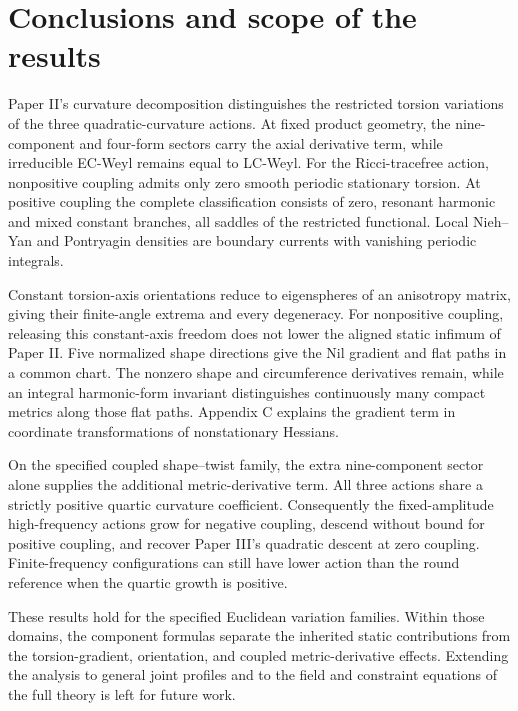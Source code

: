 \section{Conclusions and scope of the results}

Paper II's curvature decomposition distinguishes the restricted torsion
variations of the three quadratic-curvature actions. At fixed product geometry,
the nine-component and four-form sectors carry the axial derivative term,
while irreducible EC-Weyl remains equal to LC-Weyl. For the Ricci-tracefree action, nonpositive coupling admits only zero
smooth periodic stationary torsion. At positive coupling
the complete classification consists of zero, resonant harmonic and mixed
constant branches, all saddles of the restricted functional. Local Nieh--Yan
and Pontryagin densities are boundary currents with vanishing periodic integrals.

Constant torsion-axis orientations reduce to eigenspheres of an anisotropy
matrix, giving their finite-angle extrema and every degeneracy. For nonpositive
coupling, releasing this constant-axis freedom does not lower the aligned
static infimum of Paper II. Five normalized shape directions give the Nil
gradient and flat paths in a common chart. The nonzero shape and circumference
derivatives remain, while an integral harmonic-form invariant distinguishes
continuously many compact metrics along those flat paths. Appendix C explains
the gradient term in coordinate transformations of nonstationary Hessians.

On the specified coupled shape--twist family, the extra nine-component sector
alone supplies the additional metric-derivative term. All three actions share
a strictly positive quartic curvature coefficient. Consequently the
fixed-amplitude high-frequency actions grow for negative coupling, descend
without bound for positive coupling, and recover Paper III's quadratic descent
at zero coupling. Finite-frequency configurations can still have lower action
than the round reference when the quartic growth is positive.

These results hold for the specified Euclidean variation families. Within
those domains, the component formulas separate the inherited static
contributions from the torsion-gradient, orientation, and coupled
metric-derivative effects. Extending the analysis to general joint profiles
and to the field and constraint equations of the full theory is left for
future work.
